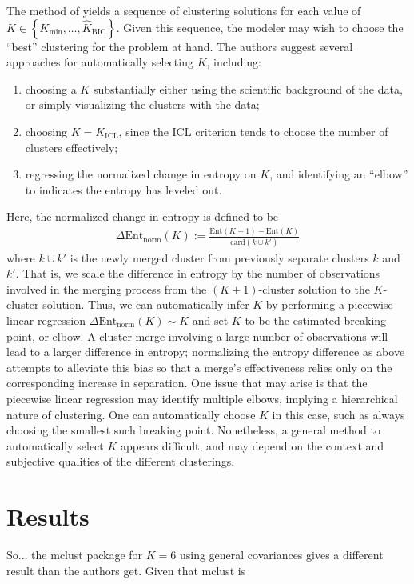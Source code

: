 \documentclass{uwstat572}
\newcommand*\ba{\[ \begin{aligned}}
\newcommand*\ea{\end{aligned} \]}
\newcommand*\set[1]{\left\{#1\right\}}
\newcommand*\estim[1]{\widehat{#1}}
\renewcommand\;{\,}
\begin{document}
The method of \cite{Baudry10} yields a sequence of clustering solutions for each value of $K \in \set{K_\text{min}, \dotsc, \estim K_\text{BIC}}$.
Given this sequence, the modeler may wish to choose the ``best'' clustering for the problem at hand.
The authors suggest several approaches for automatically selecting $K$, including:
\begin{enumerate}
\item
choosing a $K$ substantially either using the scientific background of the data, or simply visualizing the clusters with the data;
\item
choosing $K = K_\text{ICL}$, since the ICL criterion tends to choose the number of clusters effectively;
\item
regressing the normalized change in entropy on $K$, and identifying an ``elbow'' to indicates the entropy has leveled out.
\end{enumerate}
Here, the normalized change in entropy is defined to be
\ba
\Delta\text{Ent}_\text{norm}(K)
	:= \frac{ \text{Ent}(K + 1) - \text{Ent}(K) }{ \text{card}\left(k \cup k'\right) } 
\ea
where $k\cup k'$ is the newly merged cluster from previously separate clusters $k$ and $k'$.
That is, we scale the difference in entropy by the number of observations involved in the merging process from the $(K+1)$-cluster solution to the $K$-cluster solution.
Thus, we can automatically infer $K$ by performing a piecewise linear regression $\Delta \text{Ent}_\text{norm}(K) \sim K$ and set $K$ to be the estimated breaking point, or elbow.
A cluster merge involving a large number of observations will lead to a larger difference in entropy; normalizing the entropy difference as above attempts to alleviate this bias so that a merge's effectiveness relies only on the corresponding increase in separation.
One issue that may arise is that the piecewise linear regression may identify multiple elbows, implying a hierarchical nature of clustering.
One can automatically choose $K$ in this case, such as always choosing the smallest such breaking point.
Nonetheless, a general method to automatically select $K$ appears difficult, and may depend on the context and subjective qualities of the different clusterings.

\section{Results}
So... the mclust package for $K = 6$ using general covariances gives a different result than the authors get.
Given that mclust is 
\end{document}
